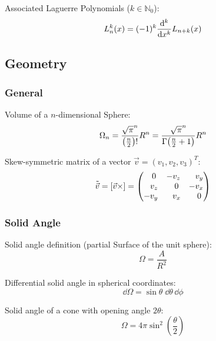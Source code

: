 			\noindent
			Associated Laguerre Polynomials ($k\in\mathbb{N}_0$):
			\begin{equation}
				L_n^k(x) = (-1)^k\dv[k]{x} L_{n+k}(x)
			\end{equation}

	\subsection{Geometry}
		\subsubsection{General}
			\noindent
			Volume of a $n$-dimensional Sphere:
			\begin{equation}
				\Omega_n = \frac{\sqrt{\pi}^n}{\qty(\frac{n}{2})!}R^n
				= \frac{\sqrt{\pi}^n}{\Gamma\qty(\frac{n}{2}+1)}R^n
			\end{equation}

			\noindent
			Skew-symmetric matrix of a vector $\vec{v} = (v_1, v_2, v_3)^T$:
			\begin{equation}
				\tilde{\vec{v}} = \qty[\vec{v}\times] =
				\qty( \begin{matrix}
					\M 0   & -v_z   & \M v_y \\
					\M v_z & \M 0   & - v_x \\
					-v_y   & \M v_x & \M 0 \\
				\end{matrix} ) \\
			\end{equation}

		\subsubsection{Solid Angle}
			\noindent
			Solid angle definition (partial Surface of the unit sphere):
			\begin{equation}
				\Omega = \frac{A}{R^2}
			\end{equation}

			\noindent
			Differential solid angle in spherical coordinates:
			\begin{equation}
				\dd \Omega = \sin\theta\;\dd \theta \,\dd \phi
			\end{equation}

			\noindent
			Solid angle of a cone with opening angle $2\theta$:
			\begin{equation}
				\Omega = 4\pi\sin^2\left(\frac{\theta}{2}\right)
			\end{equation}

